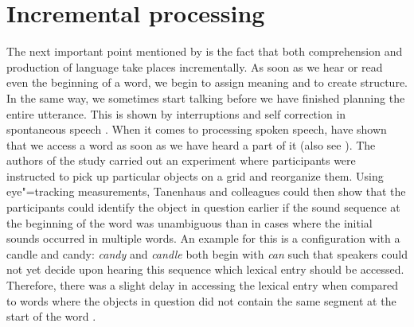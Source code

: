 \section{Incremental processing}
\label{Abschnitt-Inkrementelle-Verarbeitung}

The next important point mentioned by \citet{SW2011a} is the fact that both comprehension and production of language take places incrementally.
As soon as we hear or read even the beginning of a word, we begin to assign meaning and to create structure.
In the same way, we sometimes start talking before we have finished planning the entire utterance.
This is shown by interruptions and self correction in spontaneous speech \citep{CW98a,CFT2002a}.
When it comes to processing spoken speech, \citet{TSKES96a} have shown that we access a word as soon
as we have heard a part of it (also see \citealp{Marslen-Wilson75a}).  The authors of the study carried out an experiment where participants were instructed
to pick up particular objects on a grid and reorganize them. Using eye"=tracking measurements,
Tanenhaus and colleagues could then show that the participants could identify the object in question
earlier if the sound sequence at the beginning of the word was unambiguous than in cases 
where the initial sounds occurred in multiple words. An example for this is a configuration with a candle and candy: \emph{candy} and \emph{candle}
both begin with \emph{can} such that speakers could not yet decide upon hearing this sequence which lexical entry should be accessed. Therefore, there
was a slight delay in accessing the lexical entry when compared to words where the objects in question did not contain the same segment at the
start of the word \citep[]{TSKES95a}.

